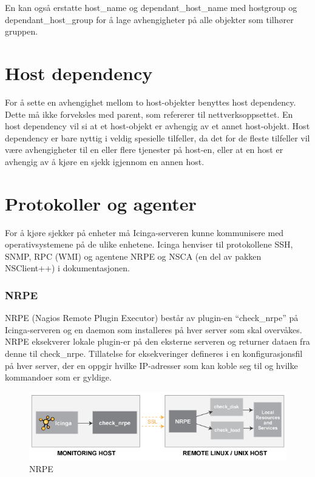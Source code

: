 En kan også erstatte host\_name og dependant\_host\_name med hostgroup og dependant\_host\_group for å lage avhengigheter på alle objekter som tilhører gruppen.

\section{Host dependency}
For å sette en avhengighet mellom to host-objekter benyttes host dependency. Dette må ikke forveksles med parent, som refererer til nettverksoppsettet. En host dependency vil si at et host-objekt er avhengig av et annet host-objekt. Host dependency er bare nyttig i veldig spesielle tilfeller, da det for de fleste tilfeller vil være avhengigheter til en eller flere tjenester på host-en\cite{hostandservicedep}, eller at en host er avhengig av å kjøre en sjekk igjennom en annen host.

\section{Protokoller og agenter}
For å kjøre sjekker på enheter må Icinga-serveren kunne kommunisere med operativsystemene på de ulike enhetene. Icinga henviser til protokollene SSH, SNMP, RPC (WMI) og agentene NRPE og NSCA (en del av pakken NSClient++) i dokumentasjonen\cite{icingaintegration,icingaadditionalsoftware}. 

\subsubsection{NRPE}\label{sec:nrpe}
NRPE (Nagios Remote Plugin Executor) består av plugin-en ``check\_nrpe'' på Icinga-serveren og en daemon som installeres på hver server som skal overvåkes. NRPE eksekverer lokale plugin-er på den eksterne serveren og returner dataen fra denne til check\_nrpe. Tillatelse for eksekveringer defineres i en konfigurasjonsfil på hver server, der en oppgir hvilke IP-adresser som kan koble seg til og hvilke kommandoer som er gyldige. 

\begin{figure}[H]
    \centering
    \includegraphics[scale=0.6]{img/nrpe.png}
    \caption{NRPE}
    \label{nrpe}
\end{figure}


